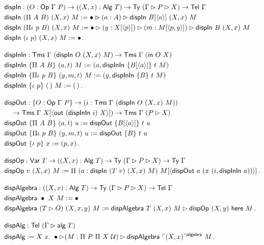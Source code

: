\begin{align*}
&\mta{dispIn} : (O : \mta{Op}\ \Gamma\ P) \to ((X, x) : \mta{Alg}\ T) \to \mta{Ty}\ (\Gamma \rhd P \rhd X) \to \Tel\ \Gamma \\
&\mta{dispIn}\ (\Pi\ A\ B)\ (X, x)\ M := \bullet \rhd (a : A) \rhd \mta{dispIn}\ B[\Msub a]\ (X, x)\ M \\
&\mta{dispIn}\ (\Pi\iota\ p\ B)\ (X, x)\ M := \bullet \rhd (y : X[\Msub p]) \rhd (m : M[\Msub{p, y}]) \rhd \mta{dispIn}\ B\ (X, x)\ M \\
&\mta{dispIn}\ (\iota\ p)\ (X, x)\ M := \bullet \,. \\[1em]
&\mta{dispInIn} : \Tms\ \Gamma\ (\mta{dispIn}\ O\ (X, x)\ M) \to \Tms\ \Gamma\ (\mta{in}\ O\ X) \\
&\mta{dispInIn}\ \{\Pi\ A\ B\}\ (a, t)\ M := (a, \mta{dispInIn}\ \{B[\Msub a]\}\ t\ M) \\
&\mta{dispInIn}\ \{\Pi\iota\ p\ B\}\ (y, m, t)\ M := (y,\mta{dispInIn}\ \{B\}\ t\ M) \\
&\mta{dispInIn}\ \{\iota\ p\}\ (\,)\ M := (\,) \,. \\[1em]
&\mta{dispOut} : \{O : \Op\ \Gamma\ P\} \to (i : \Tms\ \Gamma\ (\mta{dispIn}\ O\ (X, x)\ M)) \\
&\quad\to \Tms\ \Gamma\ X[\Msub{\mta{out}\ (\mta{dispInIn}\ i)\ X}]) \to \Tms\ \Gamma\ (P \rhd X) \\
&\mta{dispOut}\ \{\Pi\ A\ B\}\ (a, t)\ u := \mta{dispOut}\ \{B[\Msub a]\}\ t\ u \\
&\mta{dispOut}\ \{\Pi\iota\ p\ B\}\ (y, m, t)\ u := \mta{dispOut}\ \{B\}\ t\ u \\
&\mta{dispOut}\ \{\iota\ p\}\ x := (p, x) \,. \\[1em]
&\mta{dispOp} : \mta{Var}\ T \to ((X, x) : \mta{Alg}\ T) \to \mta{Ty}\ (\Gamma \rhd P \rhd X) \to \Ty\ \Gamma \\
&\mta{dispOp}\ v\ (X, x)\ M := \Pi\ (a : \mta{dispIn}\ (T\ v)\ (X, x)\ M)\ M[\Msub{\mta{dispOut}\ a\ (x\ (i, \mta{dispInIn}\ a))}]\, . \\[1em]
&\mta{dispAlgebra} : ((X, x) : \mta{Alg}\ T) \to \mta{Ty}\ (\Gamma \rhd P \rhd X) \to \Tel\ \Gamma \\
&\mta{dispAlgebra}\ \bullet\ X\ M := \bullet \\
&\mta{dispAlgebra}\ (T \rhd O)\ (X, x, y)\ M := \mta{dispAlgebra}\ T\ (X, x)\ M \rhd \mta{dispOp}\ (X, y)\ \mta{here}\ M \,. \\[1em]
&\mta{dispAlg} : \Tel\ (\Gamma \rhd \mta{alg}\ T) \\
&\mta{dispAlg} := X\ x.\ \bullet \rhd (M : \Pi\ P\ \Pi\ X\ \univ) \rhd \mta{dispAlgebra}\ \emb{(X, x)}^{\mta{algebra}}\ M \,.
\end{align*}

